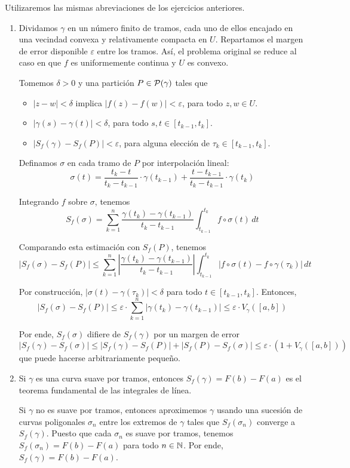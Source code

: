 \begin{solution}
Utilizaremos las mismas abreviaciones de los ejercicios anteriores.

\begin{enumerate}[label=(\alph*)]
    \item Dividamos $\gamma$ en un número finito de tramos, cada uno de ellos encajado en una vecindad convexa y relativamente compacta en $U$. Repartamos el margen de error disponible $\varepsilon$ entre los tramos. Así, el problema original se reduce al caso en que $f$ es uniformemente continua y $U$ es convexo.
    
    Tomemos $\delta > 0$ y una partición $P \in \P(\gamma)$ tales que
    \begin{itemize}
        \item $|z-w| < \delta$ implica $|f(z) - f(w)| < \varepsilon$, para todo $z, w \in U$.
        \item $|\gamma(s) - \gamma(t)| < \delta$, para todo $s, t \in [t_{k-1}, t_k]$.
        \item $|S_f(\gamma) - S_f(P)| < \varepsilon$, para alguna elección de $\tau_k \in [t_{k-1}, t_k]$.
    \end{itemize}
    
    Definamos $\sigma$ en cada tramo de $P$ por interpolación lineal:
    $$\sigma(t) = \frac {t_k - t} {t_k - t_{k-1}} \cdot \gamma(t_{k-1}) + \frac {t - t_{k-1}} {t_k - t_{k-1}} \cdot \gamma(t_k)$$
    
    Integrando $f$ sobre $\sigma$, tenemos
    $$S_f(\sigma) = \sum_{k=1}^n \frac {\gamma(t_k) - \gamma(t_{k-1})} {t_k - t_{k-1}} \int_{t_{k-1}}^{t_k} f \circ \sigma(t) \, dt$$
    
    Comparando esta estimación con $S_f(P)$, tenemos
    $$
    |S_f(\sigma) - S_f(P)|
        \le \sum_{k=1}^n \left| \frac {\gamma(t_k) - \gamma(t_{k-1})} {t_k - t_{k-1}} \right|
            \int_{t_{k-1}}^{t_k} |f \circ \sigma(t) - f \circ \gamma(\tau_k)| \, dt
    $$
    
    Por construcción, $|\sigma(t) - \gamma(\tau_k)| < \delta$ para todo $t \in [t_{k-1}, t_k]$. Entonces,
    $$
    |S_f(\sigma) - S_f(P)|
        \le \varepsilon \cdot \sum_{k=1}^n |\gamma(t_k) - \gamma(t_{k-1})|
        \le \varepsilon \cdot V_\gamma([a,b])
    $$
    
    Por ende, $S_f(\sigma)$ difiere de $S_f(\gamma)$ por un margen de error
    $$|S_f(\gamma) - S_f(\sigma)| \le |S_f(\gamma) - S_f(P)| + |S_f(P) - S_f(\sigma)| \le \varepsilon \cdot (1 + V_\gamma([a,b]))$$
    que puede hacerse arbitrariamente pequeño.
    
    \item Si $\gamma$ es una curva suave por tramos, entonces $S_f(\gamma) = F(b) - F(a)$ es el teorema fundamental de las integrales de línea.
    
    Si $\gamma$ no es suave por tramos, entonces aproximemos $\gamma$ usando una sucesión de curvas poligonales $\sigma_n$ entre los extremos de $\gamma$ tales que $S_f(\sigma_n)$ converge a $S_f(\gamma)$. Puesto que cada $\sigma_n$ es suave por tramos, tenemos $S_f(\sigma_n) = F(b) - F(a)$ para todo $n \in \N$. Por ende, $S_f(\gamma) = F(b) - F(a)$.
\end{enumerate}
\end{solution}
